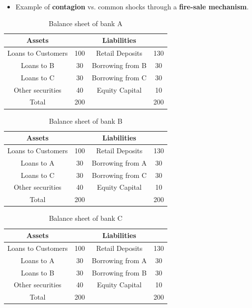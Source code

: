 \documentclass[11pt]{beamer}
\newcommand{\mcdr}[1]{{{\bf \color{red4}#1}}}
\begin{document}
\begin{frame}
 \begin{itemize}
  \item Example of \mcdr{contagion} vs. common shocks through a \mcdr{fire-sale mechanism}.
 \end{itemize}
\color{black}
\begin{table}
 \begin{tabular}{|c|c||c|c|}
  \hline
  Assets & & Liabilities & \\
  \hline
  Loans to Customers & 100 & Retail Deposits & 130\\
  Loans to B & 30 & Borrowing from B & 30\\
  Loans to C & 30 & Borrowing from C & 30\\
  Other securities & 40 & Equity Capital & 10\\
  Total & 200 & & 200\\
  \hline
 \end{tabular}
\caption{Balance sheet of bank A}
\end{table}

\end{frame}

\begin{frame}
\vspace{5mm}
\color{black}
\begin{table}
 \begin{tabular}{|c|c||c|c|}
  \hline
  Assets & & Liabilities & \\
  \hline
  Loans to Customers & 100 & Retail Deposits & 130\\
  Loans to A & 30 & Borrowing from A & 30\\
  Loans to C & 30 & Borrowing from C & 30\\
  Other securities & 40 & Equity Capital & 10\\
  Total & 200 & & 200\\
  \hline
 \end{tabular}
\caption{Balance sheet of bank B}
\end{table}
\vspace{-5mm}
\begin{table}
 \begin{tabular}{|c|c||c|c|}
  \hline
  Assets & & Liabilities & \\
  \hline
  Loans to Customers & 100 & Retail Deposits & 130\\
  Loans to A & 30 & Borrowing from A & 30\\
  Loans to B & 30 & Borrowing from B & 30\\
  Other securities & 40 & Equity Capital & 10\\
  Total & 200 & & 200\\
  \hline
 \end{tabular}
\caption{Balance sheet of bank C}
\end{table}
\end{frame}
\end{document}
